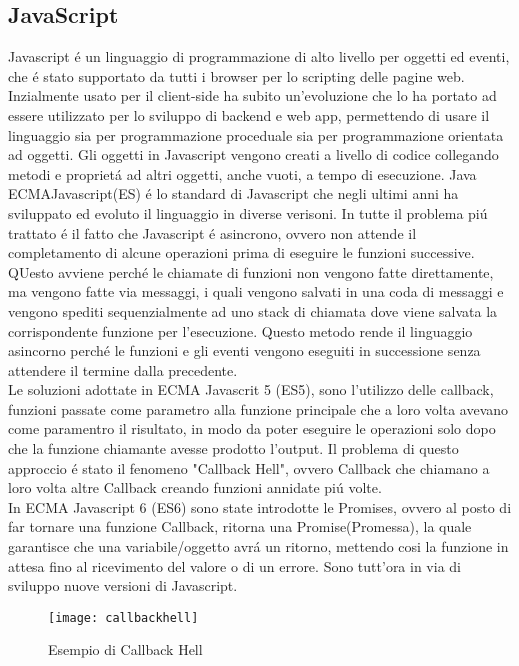 \subsection{JavaScript}
Javascript \'e un linguaggio di programmazione di alto livello per oggetti ed eventi, che \'e stato supportato da tutti i browser
per lo scripting delle pagine web.
Inzialmente usato per il client-side ha subito un'evoluzione che lo ha portato ad essere utilizzato per lo sviluppo di backend e web app,
permettendo di usare il linguaggio sia per programmazione proceduale sia per programmazione orientata ad oggetti.
Gli oggetti in Javascript vengono creati a livello di codice collegando metodi e propriet\'a ad altri oggetti, anche vuoti, a tempo
di esecuzione.
Java
\\[2\baselineskip]
ECMAJavascript(ES) \'e lo standard di Javascript che negli ultimi anni ha sviluppato ed evoluto il linguaggio in diverse verisoni.
In tutte il problema pi\'u trattato \'e il fatto che Javascript \'e asincrono, ovvero non attende il completamento di alcune
operazioni prima di eseguire le funzioni successive. QUesto avviene perch\'e le chiamate di funzioni non vengono fatte direttamente, ma vengono
fatte via messaggi, i quali vengono salvati in una coda di messaggi e vengono spediti sequenzialmente ad uno stack di chiamata dove
viene salvata la corrispondente funzione per l'esecuzione. Questo metodo rende il linguaggio asincorno perch\'e le funzioni e gli eventi
vengono eseguiti in successione senza attendere il termine dalla precedente.
\\[1\baselineskip]Le soluzioni adottate in ECMA Javascrit 5 (ES5), sono l'utilizzo delle callback,
funzioni passate come parametro alla funzione principale che a loro volta avevano come paramentro il risultato, in modo da poter eseguire le operazioni
solo dopo che la funzione chiamante avesse prodotto l'output. Il problema di questo approccio \'e stato il fenomeno "Callback Hell", ovvero Callback che chiamano a loro volta
altre Callback creando funzioni annidate pi\'u volte.
\\[1\baselineskip]
In ECMA Javascript 6 (ES6) sono state introdotte le Promises, ovvero al posto di far tornare una funzione Callback, ritorna una Promise(Promessa),
la quale garantisce che una variabile/oggetto avr\'a un ritorno, mettendo cosi la funzione in attesa fino al ricevimento del valore o di un errore.
Sono tutt'ora in via di sviluppo nuove versioni di Javascript.
\\[2\baselineskip]
\begin{figure}[h]
    \texttt{[image: callbackhell]}
    \caption{Esempio di Callback Hell}
\end{figure}

